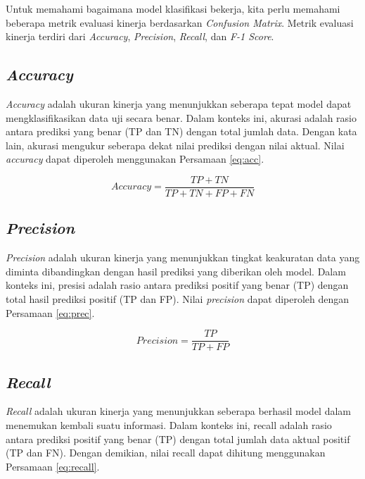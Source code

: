 Untuk memahami bagaimana model klasifikasi bekerja, kita perlu memahami beberapa metrik evaluasi kinerja berdasarkan \emph{Confusion Matrix}. Metrik evaluasi kinerja terdiri dari \emph{Accuracy}, \emph{Precision}, \emph{Recall}, dan \emph{F-1 Score}.

\subsection{\emph{Accuracy}}
\label{subsec:acc_klasifikasi}

\emph{Accuracy} adalah ukuran kinerja yang menunjukkan seberapa tepat model dapat mengklasifikasikan data uji secara benar. Dalam konteks ini, akurasi adalah rasio antara prediksi yang benar (TP dan TN) dengan total jumlah data. Dengan kata lain, akurasi mengukur seberapa dekat nilai prediksi dengan nilai aktual. Nilai \emph{accuracy} dapat diperoleh menggunakan Persamaan \ref{eq:acc}. 

\begin{equation}
  \label{eq:acc}
  Accuracy=\frac{TP+TN}{TP+TN+FP+FN}
\end{equation}

\subsection{\emph{Precision}}
\label{subsec:prec_klasifikasi}

\emph{Precision} adalah ukuran kinerja yang menunjukkan tingkat keakuratan data yang diminta dibandingkan dengan hasil prediksi yang diberikan oleh model. Dalam konteks ini, presisi adalah rasio antara prediksi positif yang benar (TP) dengan total hasil prediksi positif (TP dan FP). Nilai \emph{precision} dapat diperoleh dengan Persamaan \ref{eq:prec}.

\begin{equation}
  \label{eq:prec}
  Precision=\frac{TP}{TP+FP}
\end{equation}

\subsection{\emph{Recall}}
\label{subsec:recall_klasifikasi}

\emph{Recall} adalah ukuran kinerja yang menunjukkan seberapa berhasil model dalam menemukan kembali suatu informasi. Dalam konteks ini, recall adalah rasio antara prediksi positif yang benar (TP) dengan total jumlah data aktual positif (TP dan FN). Dengan demikian, nilai recall dapat dihitung menggunakan Persamaan \ref{eq:recall}.

